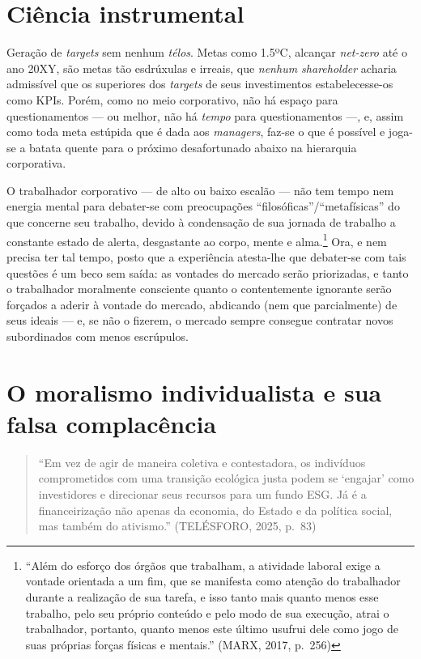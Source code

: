 \hypertarget{ciuxeancia-instrumental}{%
\section{Ciência instrumental}\label{ciuxeancia-instrumental}}

Geração de \emph{targets} sem nenhum \emph{télos}. Metas como 1.5ºC,
alcançar \emph{net-zero} até o ano 20XY, são metas tão esdrúxulas e
irreais, que \emph{nenhum shareholder} acharia admissível que os
superiores dos \emph{targets} de seus investimentos estabelecesse-os
como KPIs. Porém, como no meio corporativo, não há espaço para
questionamentos --- ou melhor, não há \emph{tempo} para questionamentos
---, e, assim como toda meta estúpida que é dada aos \emph{managers},
faz-se o que é possível e joga-se a batata quente para o próximo
desafortunado abaixo na hierarquia corporativa.

O trabalhador corporativo --- de alto ou baixo escalão --- não tem tempo
nem energia mental para debater-se com preocupações
``filosóficas''/``metafísicas'' do que concerne seu trabalho, devido à
condensação de sua jornada de trabalho a constante estado de alerta,
desgastante ao corpo, mente e alma.\footnote{``Além do esforço dos
  órgãos que trabalham, a atividade laboral exige a vontade orientada a
  um fim, que se manifesta como atenção do trabalhador durante a
  realização de sua tarefa, e isso tanto mais quanto menos esse
  trabalho, pelo seu próprio conteúdo e pelo modo de sua execução, atrai
  o trabalhador, portanto, quanto menos este último usufrui dele como
  jogo de suas próprias forças físicas e mentais.'' (MARX, 2017, p.~256)}
Ora, e nem precisa ter tal tempo, posto que a experiência atesta-lhe que
debater-se com tais questões é um beco sem saída: as vontades do mercado
serão priorizadas, e tanto o trabalhador moralmente consciente quanto o
contentemente ignorante serão forçados a aderir à vontade do mercado,
abdicando (nem que parcialmente) de seus ideais --- e, se não o fizerem,
o mercado sempre consegue contratar novos subordinados com menos
escrúpulos.

\hypertarget{o-moralismo-individualista-e-sua-falsa-complacuxeancia}{%
\section{O moralismo individualista e sua falsa
complacência}\label{o-moralismo-individualista-e-sua-falsa-complacuxeancia}}

\begin{quote}
``Em vez de agir de maneira coletiva e contestadora, os indivíduos
comprometidos com uma transição ecológica justa podem se `engajar' como
investidores e direcionar seus recursos para um fundo ESG. Já é a
financeirização não apenas da economia, do Estado e da política social,
mas também do ativismo.'' (TELÉSFORO, 2025, p.~83)
\end{quote}

